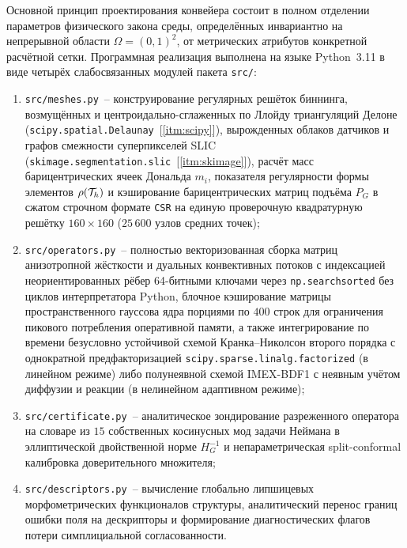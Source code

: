 Основной принцип проектирования конвейера состоит в полном отделении параметров физического закона среды, определённых инвариантно на непрерывной области $\Omega=(0,1)^2$, от метрических атрибутов конкретной расчётной сетки. Программная реализация выполнена на языке Python~3.11 в виде четырёх слабосвязанных модулей пакета \texttt{src/}:
\begin{enumerate}
    \item \texttt{src/meshes.py}~-- конструирование регулярных решёток биннинга, возмущённых и центроидально-сглаженных по Ллойду триангуляций Делоне (\texttt{scipy.spatial.Delaunay}~[\ref{itm:scipy}]), вырожденных облаков датчиков и графов смежности суперпикселей SLIC (\texttt{skimage.segmentation.slic}~[\ref{itm:skimage}]), расчёт масс барицентрических ячеек Дональда $m_i$, показателя регулярности формы элементов $\rho(\mathcal{T}_h)$ и кэширование барицентрических матриц подъёма $P_G$ в сжатом строчном формате \texttt{CSR} на единую проверочную квадратурную решётку $160\times 160$ ($25\,600$ узлов средних точек);
    \item \texttt{src/operators.py}~-- полностью векторизованная сборка матриц анизотропной жёсткости и дуальных конвективных потоков с индексацией неориентированных рёбер 64-битными ключами через \texttt{np.searchsorted} без циклов интерпретатора Python, блочное кэширование матрицы пространственного гауссова ядра порциями по $400$ строк для ограничения пикового потребления оперативной памяти, а также интегрирование по времени безусловно устойчивой схемой Кранка--Николсон второго порядка с однократной предфакторизацией \texttt{scipy.sparse.linalg.factorized} (в линейном режиме) либо полунеявной схемой IMEX-BDF1 с неявным учётом диффузии и реакции (в нелинейном адаптивном режиме);
    \item \texttt{src/certificate.py}~-- аналитическое зондирование разреженного оператора на словаре из $15$ собственных косинусных мод задачи Неймана в эллиптической двойственной норме $H_G^{-1}$ и непараметрическая split-conformal калибровка доверительного множителя;
    \item \texttt{src/descriptors.py}~-- вычисление глобально липшицевых морфометрических функционалов структуры, аналитический перенос границ ошибки поля на дескрипторы и формирование диагностических флагов потери симплициальной согласованности.
\end{enumerate}

